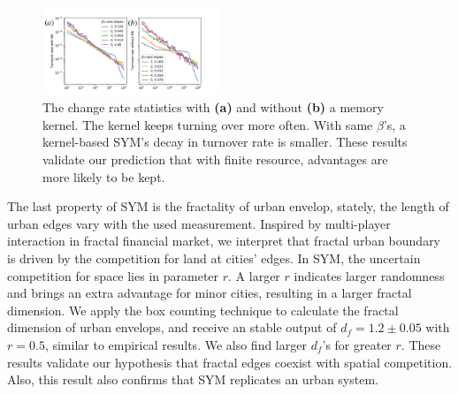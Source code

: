 \documentclass[reprint,unsortedaddress,amsmath,amssymb,aps,prl,showkeys]{revtex4-2}
\begin{document}
\begin{figure}
	\centering
	\includegraphics[width = 0.47\textwidth]{pics/in_one_now_now.pdf}
	\caption{The change rate statistics with \textbf{(a)} and without \textbf{(b)} a memory kernel. The kernel keeps turning over more often. With same $\beta$'s, a kernel-based SYM's decay in turnover rate is smaller. These results validate our prediction that with finite resource, advantages are more likely to be kept.}
	\label{changerate}
\end{figure}

The last property of SYM is the fractality of urban envelop, stately, the length of urban edges vary with the used measurement. Inspired by multi-player interaction in fractal financial market\cite{PhysRevE.65.037106}, we interpret that fractal urban boundary is driven by the competition for land at cities' edges. In SYM, the uncertain competition for space lies in parameter $r$. A larger $r$ indicates larger randomness and brings an extra advantage for minor cities, resulting in a larger fractal dimension. We apply the box counting technique to calculate the fractal dimension of urban envelops, and receive an stable output of $d_f = 1.2\pm 0.05$ with $r = 0.5$, similar to empirical results\cite{batty1992form}. We also find larger $d_f$'s for greater $r$. These results validate our hypothesis that fractal edges coexist with spatial competition. Also, this result also confirms that SYM replicates an urban system.


\end{document}
